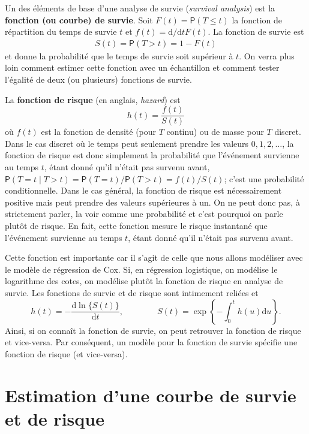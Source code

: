 \documentclass[
  11pt,
  letterpaper,
]{book}
\theoremstyle{definition}
\theoremstyle{definition}
\theoremstyle{definition}
\theoremstyle{definition}
\theoremstyle{remark}
\begin{document}
Un des éléments de base d'une analyse de survie (\emph{survival analysis}) est la \textbf{fonction (ou courbe) de survie}. Soit \(F(t)={\mathsf P}\left(T \leq t\right)\) la fonction de répartition du temps de survie \(t\) et \(f(t) = \mathrm{d}/ \mathrm{d}t F(t)\). La fonction de survie est
\begin{align*}
S(t)= {\mathsf P}\left(T > t\right) = 1-F(t)
\end{align*}
et donne la probabilité que le temps de survie soit supérieur à \(t\). On verra plus loin comment estimer cette fonction avec un échantillon et comment tester l'égalité de deux (ou plusieurs) fonctions de survie.

La \textbf{fonction de risque} (en anglais, \emph{hazard}) est
\[h(t) =  \frac{f(t)}{S(t)}\]
où \(f(t)\) est la fonction de densité (pour \(T\) continu) ou de masse pour \(T\) discret.
Dans le cas discret où le temps peut seulement prendre les valeurs \(0, 1, 2, \ldots\), la fonction de risque est donc simplement la probabilité que l'événement survienne au temps \(t\), étant donné qu'il n'était pas survenu avant, \({\mathsf P}\left(T=t \mid T > t\right) = {\mathsf P}\left(T=t\right) / {\mathsf P}\left(T >t\right) = f(t)/S(t)\); c'est une probabilité conditionnelle. Dans le cas général, la fonction de risque est nécessairement positive mais peut prendre des valeurs supérieures à un. On ne peut donc pas, à strictement parler, la voir comme une probabilité et c'est pourquoi on parle plutôt de risque. En fait, cette fonction mesure le risque instantané que l'événement survienne au temps \(t\), étant donné qu'il n'était pas survenu avant.

Cette fonction est importante car il s'agit de celle que nous allons modéliser avec le modèle de régression de Cox. Si, en régression logistique, on modélise le logarithme des cotes, on modélise plutôt la fonction de risque en analyse de survie.
Les fonctions de survie et de risque sont intimement reliées et
\[ h(t) = - \frac{\mathrm{d}\ln\{S(t)\}}{\mathrm{d}t}, \qquad \qquad S(t) = \exp \left\{ -\int_0^t h(u) \mathrm{d}u\right\}. \]
Ainsi, si on connaît la fonction de survie, on peut retrouver la fonction de risque et vice-versa. Par conséquent, un modèle pour la fonction de survie spécifie une fonction de risque (et vice-versa).

\hypertarget{estimation-dune-courbe-de-survie-et-de-risque}{%
\section{Estimation d'une courbe de survie et de risque}\label{estimation-dune-courbe-de-survie-et-de-risque}}
\end{document}
